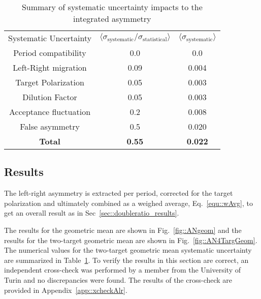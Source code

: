 \begin{table}[h!t]
  \centering
  \begin{tabular}{|c|c|c|}
    \hline
    \multirow{2}{*}{Systematic Uncertainty}&
    \multirow{2}{*}{
      $\langle \sigma_{\mathrm{systematic}}/\sigma_{\mathrm{statistical}}
      \rangle$} &
    \multirow{2}{*}{$\langle \sigma_{\mathrm{systematic}} \rangle$}\\
    & & \\ \hline \hline

    Period compatibility& 0.0 & 0.0\\ \hline

    Left-Right migration& 0.09 & 0.004\\ \hline

    Target Polarization& 0.05& 0.003\\ \hline

    Dilution Factor& 0.05 & 0.003\\ \hline

    Acceptance fluctuation& 0.2 & 0.008\\ \hline

    False asymmetry& 0.5 & 0.020\\ \hline \hline
    \textbf{Total}& \textbf{0.55} & \textbf{0.022}\\\hline
    
  \end{tabular}
  \caption{Summary of systematic uncertainty impacts to the integrated
    asymmetry}
  \label{tab::sysError}
\end{table}

\subsection{Results} \label{sec::lr_results}
The left-right asymmetry is extracted per period, corrected for the target
polarization and ultimately combined as a weighed average, Eq.~\ref{equ::wAvg},
to get an overall result as in Sec~\ref{sec::doubleratio_results}.

The results for the geometric mean are shown in Fig.~\ref{fig::ANgeom} and the
results for the two-target geometric mean are shown in
Fig.~\ref{fig::AN4TargGeom}.  The numerical values for the two-target geometric
mean systematic uncertainty are summarized in Table~\ref{tab::sysError}.  To
verify the results in this section are correct, an independent cross-check was
performed by a member from the University of Turin and no discrepancies were
found.  The results of the cross-check are provided in
Appendix~\ref{app::xcheckAlr}.

